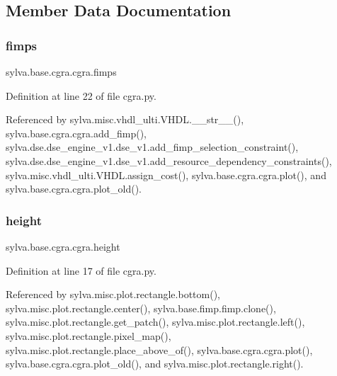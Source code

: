 \subsection{Member Data Documentation}
\mbox{\label{classsylva_1_1base_1_1cgra_1_1cgra_ad4e2965612f63dfd12593a5fe3ace3ac}} 
\subsubsection{\texorpdfstring{fimps}{fimps}}
{\footnotesize\ttfamily sylva.\+base.\+cgra.\+cgra.\+fimps}



Definition at line 22 of file cgra.\+py.



Referenced by sylva.\+misc.\+vhdl\+\_\+ulti.\+V\+H\+D\+L.\+\_\+\+\_\+str\+\_\+\+\_\+(), sylva.\+base.\+cgra.\+cgra.\+add\+\_\+fimp(), sylva.\+dse.\+dse\+\_\+engine\+\_\+v1.\+dse\+\_\+v1.\+add\+\_\+fimp\+\_\+selection\+\_\+constraint(), sylva.\+dse.\+dse\+\_\+engine\+\_\+v1.\+dse\+\_\+v1.\+add\+\_\+resource\+\_\+dependency\+\_\+constraints(), sylva.\+misc.\+vhdl\+\_\+ulti.\+V\+H\+D\+L.\+assign\+\_\+cost(), sylva.\+base.\+cgra.\+cgra.\+plot(), and sylva.\+base.\+cgra.\+cgra.\+plot\+\_\+old().

\mbox{\label{classsylva_1_1base_1_1cgra_1_1cgra_a1b1902a730c5ff918da267f662c39ece}} 
\subsubsection{\texorpdfstring{height}{height}}
{\footnotesize\ttfamily sylva.\+base.\+cgra.\+cgra.\+height}



Definition at line 17 of file cgra.\+py.



Referenced by sylva.\+misc.\+plot.\+rectangle.\+bottom(), sylva.\+misc.\+plot.\+rectangle.\+center(), sylva.\+base.\+fimp.\+fimp.\+clone(), sylva.\+misc.\+plot.\+rectangle.\+get\+\_\+patch(), sylva.\+misc.\+plot.\+rectangle.\+left(), sylva.\+misc.\+plot.\+rectangle.\+pixel\+\_\+map(), sylva.\+misc.\+plot.\+rectangle.\+place\+\_\+above\+\_\+of(), sylva.\+base.\+cgra.\+cgra.\+plot(), sylva.\+base.\+cgra.\+cgra.\+plot\+\_\+old(), and sylva.\+misc.\+plot.\+rectangle.\+right().

